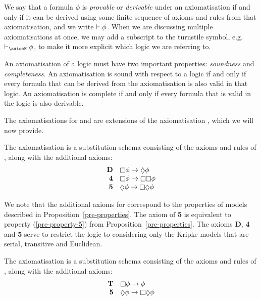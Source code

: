 We say that a formula $\phi$ is {\em provable} or {\em derivable} under an
axiomatisation if and only if it can be derived using some finite sequence of
axioms and rules from that axiomatisation, and we write $\vdash \phi$. When we
are discussing multiple axiomatisations at once, we may add a subscript to the
turnstile symbol, e.g. $\proves_\axiomK \phi$, to make it more explicit which
logic we are referring to.

An axiomatisation of a logic must have two important properties: {\em soundness}
and {\em completeness}. An axiomatisation is sound with respect to a logic if
and only if every formula that can be derived from the axiomatisation is also
valid in that logic. An axiomatisation is complete if and only if every formula
that is valid in the logic is also derivable.

The axiomatisations for \logicKD{} and \logicS{} are extensions of the
axiomatisation \axiomK{}, which we will now provide.

\begin{definition}
The axiomatisation \axiomKD{} is a substitution schema consisting of the axioms
and rules of \axiomK{}, along with the additional axioms:
$$
\begin{array}{rl}
{\bf D} & \knows \phi \implies \suspects \phi\\
{\bf 4} & \knows \phi \implies \knows \knows \phi\\
{\bf 5} & \suspects \phi \implies \knows \suspects \phi\\
\end{array}
$$
\end{definition}

We note that the additional axioms for \axiomKD{} correspond to the properties
of \classKD{} models described in Proposition~\ref{pre-properties}. The axiom of
{\bf 5} is equivalent to property (\ref{pre-property-5}) from
Proposition~\ref{pre-properties}. The axioms {\bf D}, {\bf 4} and {\bf 5} serve
to restrict the logic to considering only the Kripke models that are serial,
transitive and Euclidean.


\begin{definition}
The axiomatisation \axiomS{} is a substitution schema consisting of the axioms
and rules of \axiomK{}, along with the additional axioms:
$$
\begin{array}{rl}
{\bf T} & \knows \phi \implies \phi\\
{\bf 5} & \suspects \phi \implies \knows \suspects \phi\\
\end{array}
$$
\end{definition}

